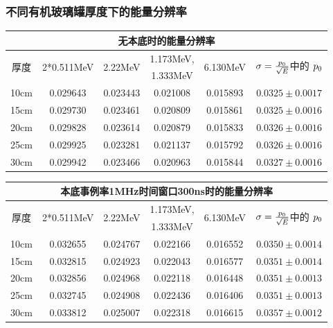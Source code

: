 \begin{frame}
    \frametitle{不同有机玻璃罐厚度下的能量分辨率}
\begin{tabular}{|c|c|c|c|c|c|}
    \hline
    \multicolumn{6}{|c|}{无本底时的能量分辨率}
    \\
\hline
\multirow{2}{*}{\footnotesize 厚度}
 & \multirow{2}{*}{\footnotesize 2*0.511MeV}
 & \multirow{2}{*}{\footnotesize 2.22MeV}
 & {\footnotesize 1.173MeV,}
 & \multirow{2}{*}{\footnotesize 6.130MeV}
 & \multirow{2}{*}{$\sigma={{\mathnormal{p}_{0}}\over\sqrt{E}}$中的
                   $\mathnormal{p}_{0}$}
\\
& & & {\footnotesize 1.333MeV} & &
\\
\hline
10cm 
 & 0.029643
 & 0.023443
 & 0.021008
 & 0.015893
 & $0.0325\pm0.0017$
\\
15cm 
 & 0.029730
 & 0.023461
 & 0.020809
 & 0.015861
 & $0.0325\pm0.0016$
\\
20cm 
 & 0.029828
 & 0.023614
 & 0.020879
 & 0.015833
 & $0.0326\pm0.0016$
\\
25cm 
 & 0.029925
 & 0.023281
 & 0.021137
 & 0.015792
 & $0.0326\pm0.0016$
\\
30cm 
 & 0.029942
 & 0.023466
 & 0.020963
 & 0.015844
 & $0.0327\pm0.0016$
\\
\hline
\end{tabular}

\begin{tabular}{|c|c|c|c|c|c|}
    \hline
    \multicolumn{6}{|c|}{本底事例率1MHz时间窗口300ns时的能量分辨率}
    \\
\hline
\multirow{2}{*}{\footnotesize 厚度}
 & \multirow{2}{*}{\footnotesize 2*0.511MeV}
 & \multirow{2}{*}{\footnotesize 2.22MeV}
 & {\footnotesize 1.173MeV,}
 & \multirow{2}{*}{\footnotesize 6.130MeV}
 & \multirow{2}{*}{$\sigma={{\mathnormal{p}_{0}}\over\sqrt{E}}$中的
                   $\mathnormal{p}_{0}$}
\\
& & & {\footnotesize 1.333MeV} & &
\\
\hline
10cm 
 & 0.032655
 & 0.024767
 & 0.022166
 & 0.016552
 & $0.0350\pm0.0014$
\\
15cm 
 & 0.032815
 & 0.024923
 & 0.022043
 & 0.016577
 & $0.0351\pm0.0014$
\\
20cm 
 & 0.032856
 & 0.024968
 & 0.022118
 & 0.016448
 & $0.0351\pm0.0013$
\\
25cm 
 & 0.032745
 & 0.024908
 & 0.022436
 & 0.016406
 & $0.0351\pm0.0013$
\\
30cm 
 & 0.033812
 & 0.025007
 & 0.022318
 & 0.016615
 & $0.0357\pm0.0012$
\\
\hline
\end{tabular}

\end{frame}

